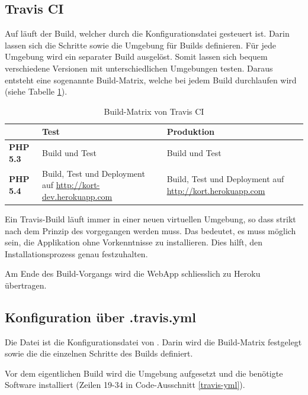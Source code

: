\subsection{Travis CI}
Auf  läuft der Build, welcher durch die Konfigurationsdatei  gesteuert ist. Darin lassen sich die Schritte sowie die Umgebung für Builds definieren.
Für jede Umgebung wird ein separater Build ausgelöst.
Somit lassen sich bequem verschiedene Versionen mit unterschiedlichen Umgebungen testen.
Daraus entsteht eine sogenannte Build-Matrix, welche bei jedem Build durchlaufen wird (siehe Tabelle \ref{infrastruktur-build-matrix}).

\begin{table}[H]
\centering
\begin{tabular}{|p{0.15\threecelltabwidth}|p{0.425\threecelltabwidth}|p{0.425\threecelltabwidth}|}
\hline 
 & \textbf{Test} & \textbf{Produktion} \\
\hline 
\textbf{PHP 5.3} & Build und Test & Build und Test \\
\hline 
\textbf{PHP 5.4} & Build, Test und Deployment auf \url{http://kort-dev.herokuapp.com} & Build, Test und Deployment auf \url{http://kort.herokuapp.com} \\
\hline 
\end{tabular} 
\caption{Build-Matrix von Travis CI}
\label{infrastruktur-build-matrix}
\end{table}

Ein Travis-Build läuft immer in einer neuen virtuellen Umgebung, so dass strikt nach dem Prinzip des \emph{} vorgegangen werden muss.
Das bedeutet, es muss möglich sein, die Applikation ohne Vorkenntnisse zu installieren.
Dies hilft, den Installationsprozess genau festzuhalten.

Am Ende des Build-Vorgangs wird die \gls{WebApp} schliesslich zu Heroku übertragen.

\subsection{Konfiguration über .travis.yml}
Die  Datei ist die Konfigurationsdatei von .
Darin wird die Build-Matrix festgelegt sowie die die einzelnen Schritte des Builds definiert.

Vor dem eigentlichen Build wird die Umgebung aufgesetzt und die benötigte Software installiert (Zeilen 19-34 in Code-Ausschnitt \ref{travis-yml}).


